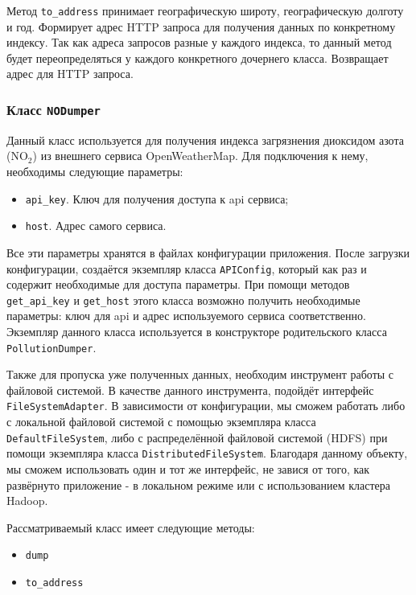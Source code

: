 Метод \texttt{to\_address} принимает географическую широту, географическую долготу и год.
Формирует адрес HTTP запроса для получения данных по конкретному индексу.
Так как адреса запросов разные у каждого индекса, то данный метод будет переопределяться у каждого конкретного дочернего класса.
Возвращает адрес для HTTP запроса.




\subsubsection{Класс \texttt{NODumper}}
Данный класс используется для получения индекса загрязнения диоксидом азота ($ \text{NO}_{\text{2}} $) из внешнего сервиса OpenWeatherMap.
Для подключения к нему, необходимы следующие параметры:

\begin{itemize}
\item \texttt{api\_key}. Ключ для получения доступа к api сервиса;
\item \texttt{host}. Адрес самого сервиса.
\end{itemize}

Все эти параметры хранятся в файлах конфигурации приложения.
После загрузки конфигурации, создаётся экземпляр класса \texttt{APIConfig}, который как раз и содержит необходимые для доступа параметры.
При помощи методов \texttt{get\_api\_key} и \texttt{get\_host} этого класса возможно получить необходимые параметры: ключ для api и адрес используемого сервиса соответственно.
Экземпляр данного класса используется в конструкторе родительского класса \texttt{PollutionDumper}.

Также для пропуска уже полученных данных, необходим инструмент работы с файловой системой.
В качестве данного инструмента, подойдёт интерфейс \texttt{FileSystemAdapter}.
В зависимости от конфигурации, мы сможем работать либо с локальной файловой системой с помощью экземпляра класса \texttt{DefaultFileSystem}, либо с распределённой файловой системой (HDFS) при помощи экземпляра класса \texttt{DistributedFileSystem}.
Благодаря данному объекту, мы сможем использовать один и тот же интерфейс, не завися от того, как развёрнуто приложение - в локальном режиме или с использованием кластера Hadoop.

Рассматриваемый класс имеет следующие методы:
\begin{itemize}
\item \texttt{dump}
\item \texttt{to\_address}
\end{itemize}

